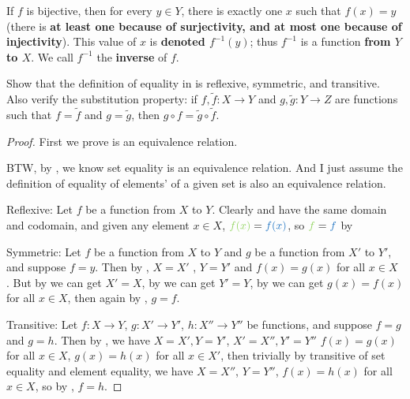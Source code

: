 If \(f\) is bijective, then for every \(y \in Y\), there is exactly one \(x\) such that \(f(x) = y\) (there is \textbf{at least one because of surjectivity, and at most one because of injectivity}). This value of \(x\) is \textbf{denoted \(f^{-1}(y)\)}; thus \(f^{-1}\) is a function \textbf{from \(Y\) to \(X\)}. We call \(f^{-1}\) the \textbf{inverse} of \(f\).

\exercisesection

\begin{exercise} \label{exercise 3.3.1}
Show that the definition of equality in  is reflexive, symmetric, and transitive. Also verify the substitution property: if \(f, \tilde{f} : X \rightarrow Y\) and \(g, \tilde{g} : Y \rightarrow Z\) are functions such that \(f = \tilde{f}\) and \(g = \tilde{g}\), then \(g \circ f = \tilde{g} \circ \tilde{f}\).
\end{exercise}

\begin{proof}
First we prove  is an equivalence relation.

BTW, by , we know set equality is an equivalence relation. And I just assume the definition of equality of elements' of a given set is also an equivalence relation.

Reflexive: Let \(f\) be a function from \(X\) to \(Y\). Clearly  and  have the same domain and codomain, and given any element \(x \in X\), \(\GREEN{f(x)} = \BLUE{f(x)}\), so \(\GREEN{f} = \BLUE{f}\) by 

Symmetric: Let \(f\) be a function from \(X\) to \(Y\) and \(g\) be a function from \(X'\) to \(Y'\), and suppose \(f = y\). Then by , \(X = X'\) , \(Y = Y'\)  and \(f(x) = g(x)\) for all \(x \in X\) . But by  we can get \(X' = X\), by  we can get \(Y' = Y\), by  we can get \(g(x) = f(x)\) for all \(x \in X\), then again by , \(g = f\).

Transitive: Let \(f : X \rightarrow Y\), \(g : X' \rightarrow Y'\), \(h : X'' \rightarrow Y''\) be functions, and suppose \(f = g\) and \(g = h\). Then by , we have \(X = X', Y = Y'\), \(X' = X'', Y' = Y''\) \(f(x) = g(x)\) for all \(x \in X\), \(g(x) = h(x)\) for all \(x \in X'\), then trivially by transitive of set equality and element equality, we have \(X = X''\), \(Y = Y''\), \(f(x) = h(x)\) for all \(x \in X\), so by , \(f = h\).
\end{proof}

